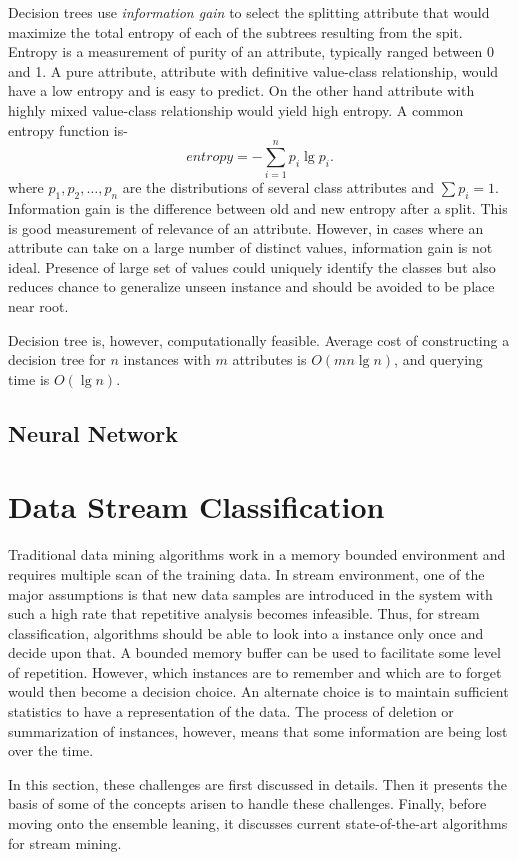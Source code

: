 \documentclass[a4paper, 11pt, oneside]{book}
\begin{document}
Decision trees use {\it information gain} to select the splitting attribute that would maximize the total entropy of each of the subtrees resulting from the spit. Entropy is a measurement of purity of an attribute, typically ranged between 0 and 1. A pure attribute, attribute with definitive value-class relationship, would have a low entropy and is easy to predict. On the other hand attribute with highly mixed value-class relationship would yield high entropy. A common entropy function is-
\[
    entropy = - \sum_{i=1}^n p_i \lg p_i.
\]
where $p_1, p_2, \dots, p_n$ are the distributions of several class attributes and $\sum p_i = 1$. Information gain is the difference between old and new entropy after a split. This is good measurement of relevance of an attribute. However, in cases where an attribute can take on a large number of distinct values, information gain is not ideal. Presence of large set of values could uniquely identify the classes but also reduces chance to generalize unseen instance and should be avoided to be place near root.

Decision tree is, however, computationally feasible. Average cost of constructing a decision tree for $n$ instances with $m$ attributes is $O(mn \lg n)$, and querying time is $O(\lg n)$.

\subsection{Neural Network}

\section{Data Stream Classification}
Traditional data mining algorithms work in a memory bounded environment and requires multiple scan of the training data. In stream environment, one of the major assumptions is that new data samples are introduced in the system with such a high rate that repetitive analysis becomes infeasible. Thus, for stream classification, algorithms should be able to look into a instance only once and decide upon that. A bounded memory buffer can be used to facilitate some level of repetition. However, which instances are to remember and which are to forget would then become a decision choice. An alternate choice is to maintain sufficient statistics to have a representation of the data. The process of deletion or summarization of instances, however, means that some information are being lost over the time.

In this section, these challenges are first discussed in details. Then it presents the basis of some of the concepts arisen to handle these challenges. Finally, before moving onto the ensemble leaning, it discusses current state-of-the-art algorithms for stream mining.
\end{document}
